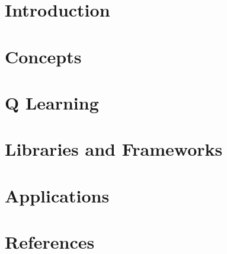 \section[Intro]{Introduction}


\section[Concepts]{Concepts}



\section[QL]{Q Learning}




\section[Libs]{Libraries and Frameworks}




\section[Apps]{Applications}




\section[Refs]{References}

